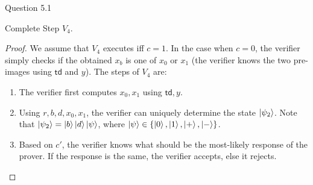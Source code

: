 \begin{solution}{Question 5.1}\label{ques:51}
    \begin{question}
        Complete Step $V_4$.
    \end{question}
    \tcblower{}
    \begin{proof}
        We assume that $V_4$ executes iff $c = 1$. In the case when $c = 0$, the verifier simply checks if the obtained $x_b$ is one of $x_0$ or $x_1$ (the verifier knows the two pre-images using $\mathsf{td}$ and $y$). The steps of $V_4$ are:
        \begin{enumerate}
            \item The verifier first computes $x_0, x_1$ using $\mathsf{td}, y$.
            \item Using $r, b, d, x_0, x_1$, the verifier can uniquely determine the state $\ket{\psi_2}$. Note that $\ket{\psi_2} = \ket{b}\ket{d}\ket{\psi}$, where $\ket{\psi} \in \{\ket{0}, \ket{1}, \ket{+}, \ket{-}\}$.
            \item Based on $c'$, the verifier knows what should be the most-likely response of the prover. If the response is the same, the verifier accepts, else it rejects.
        \end{enumerate}
    \end{proof}
\end{solution}
 

